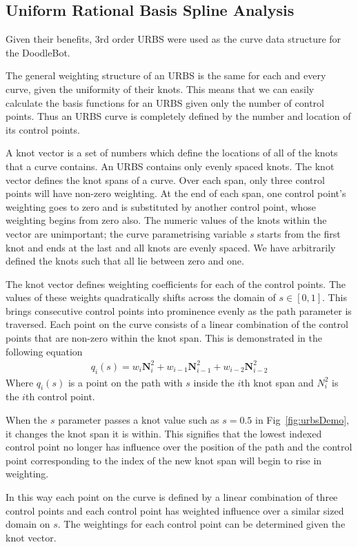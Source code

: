 \subsection{Uniform Rational Basis Spline Analysis}
Given their benefits, 3rd order URBS were used as the curve data structure for the DoodleBot. 

The general weighting structure of an URBS is the same for each and every curve, given the uniformity of their knots. This means that we can easily calculate the basis functions for an URBS given only the number of control points. Thus an URBS curve is completely defined by the number and location of its control points.

A knot vector is a set of numbers which define the locations of all of the knots that a curve contains. An URBS contains only evenly spaced knots. The knot vector defines the knot spans of a curve. Over each span, only three control points will have non-zero weighting. At the end of each span, one control point's weighting goes to zero and is substituted by another control point, whose weighting begins from zero also. The numeric values of the knots within the vector are unimportant; the curve parametrising variable $s$ starts from the first knot and ends at the last and all knots are evenly spaced. We have arbitrarily defined the knots such that all lie between zero and one.

The knot vector defines weighting coefficients for each of the control points. The values of these weights quadratically shifts across the domain of $s \in [0, 1]$. This brings consecutive control points into prominence evenly as the path parameter is traversed. Each point on the curve consists of a linear combination of the control points that are non-zero within the knot span. This is demonstrated in the following equation
\begin{align*}
q_i(s) = w_i\textbf{N}_i^2 + w_{i-1}\textbf{N}_{i-1}^2 + w_{i-2}\textbf{N}_{i-2}^2
\end{align*} 
Where $q_i(s)$ is a point on the path with $s$ inside the $i$th knot span and $N_i^2$ is the $i$th control point.

When the $s$ parameter passes a knot value such as $s = 0.5$ in Fig~\ref{fig:urbsDemo}, it changes the knot span it is within. This signifies that the lowest indexed control point no longer has influence over the position of the path and the control point corresponding to the index of the new knot span will begin to rise in weighting.

In this way each point on the curve is defined by a linear combination of three control points and each control point has weighted influence over a similar sized domain on $s$. The weightings for each control point can be determined given the knot vector.

